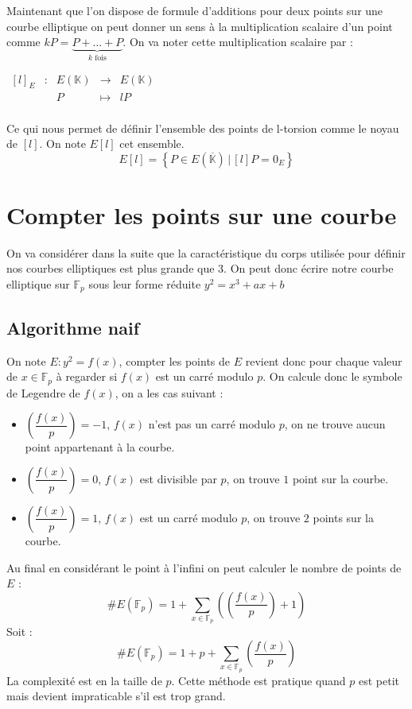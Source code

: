 \documentclass{article}
\begin{document}
Maintenant que l'on dispose de formule d'additions pour deux points sur une courbe elliptique on peut donner un sens à la multiplication scalaire d'un point comme $kP = \underbrace{P + \ldots + P}_{k \text{ fois}}$. On va noter cette multiplication scalaire par :
\newline

$\begin{array}{ccccc}
[l]_E & : & E(\mathbb{K}) & \to & E(\mathbb{K}) \\
 & & P & \mapsto & lP\\
\end{array}$

Ce qui nous permet de définir l'ensemble des points de l-torsion comme le noyau de $[l]$. On note $E[l]$ cet ensemble.
\newline
$$E[l] = \left\{ P \in E(\overline{\mathbb{K}}) \, | \, [l]P = 0_E \right\} $$

\section{Compter les points sur une courbe}
On va considérer dans la suite que la caractéristique du corps utilisée pour définir nos courbes elliptiques est plus grande que $3$. On peut donc écrire notre courbe elliptique sur $\mathbb{F}_p$ sous leur forme réduite $y^2 = x^3 + ax+b$

\subsection{Algorithme naif}
On note $E: y^2 = f(x)$, compter les points de $E$ revient donc pour chaque valeur de $x \in \mathbb{F}_p$ à regarder si $f(x)$ est un carré modulo $p$. On calcule donc le symbole de Legendre de $f(x)$, on a les cas suivant : 
\begin{itemize}
\item  $\genfrac(){}{0}{f(x)}{p} = -1$, $f(x)$ n'est pas un carré modulo $p$, on ne trouve aucun point appartenant à la courbe.
\item $\genfrac(){}{0}{f(x)}{p} = 0$, $f(x)$ est divisible par $p$, on trouve $1$ point sur la courbe.
\item $\genfrac(){}{0}{f(x)}{p} = 1$, $f(x)$ est un carré modulo $p$, on trouve $2$ points sur la courbe.
\end{itemize}
\medskip
Au final en considérant le point à l'infini on peut calculer le nombre de points de $E$ : 
\begin{equation*}
\#E(\mathbb{F}_p) = 1 + \sum_{x \in \mathbb{F}_p}(\genfrac(){}{0}{f(x)}{p} + 1)
\end{equation*}
Soit : 
\begin{equation}
\#E(\mathbb{F}_p) = 1 + p +\sum_{x \in \mathbb{F}_p}\genfrac(){}{0}{f(x)}{p}
\end{equation}
La complexité est en la taille de $p$. Cette méthode est pratique quand $p$ est petit mais devient impraticable s'il est trop grand.
\end{document}
